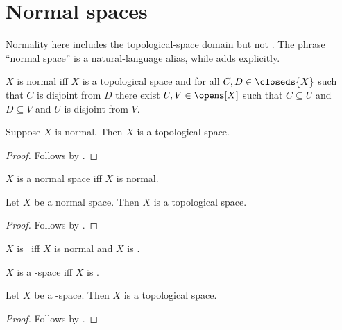 \section{Normal spaces}




Normality here includes the topological-space domain but not \teeone.
The phrase ``normal space'' is a natural-language alias, while \teefour adds
\teeone explicitly.

\begin{definition}\label{is_normal}
    $X$ is normal iff $X$ is a topological space and
        for all $C,D\in\closeds{X}$ such that
            $C$ is disjoint from $D$ there exist $U,V\in\opens[X]$ such that
            $C\subseteq U$ and $D\subseteq V$ and $U$ is disjoint from $V$.
\end{definition}

\begin{classification}\label{normal_is_topological}
    Suppose $X$ is normal.
    Then $X$ is a topological space.
\end{classification}
\begin{proof}
    Follows by .
\end{proof}

\begin{abbreviation}\label{normal_space}
    $X$ is a normal space iff $X$ is normal.
\end{abbreviation}

\begin{classification}\label{normal_space_is_topological}
    Let $X$ be a normal space.
    Then $X$ is a topological space.
\end{classification}
\begin{proof}
    Follows by .
\end{proof}

\begin{abbreviation}\label{teefour}
    $X$ is \teefour\ iff $X$ is normal and $X$ is \teeone.
\end{abbreviation}

\begin{abbreviation}\label{teefour_space}
    $X$ is a \teefour-space iff $X$ is \teefour.
\end{abbreviation}

\begin{classification}\label{teefour_space_is_topological}
    Let $X$ be a \teefour-space.
    Then $X$ is a topological space.
\end{classification}
\begin{proof}
    Follows by .
\end{proof}

